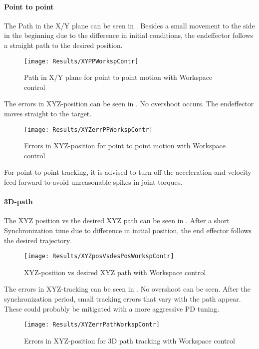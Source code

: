 \paragraph{Point to point}
The Path in the X/Y plane can be seen in . 
Besides a small movement to the side in the beginning due to the difference in initial conditions, the endeffector follows a straight path to the desired position.
\begin{figure}[H]
	\texttt{[image: Results/XYPPWorkspContr]}
	\caption{Path in X/Y plane for point to point motion with Workspace control}
	\label{fig:XYPPWorkspContr}
\end{figure}
The errors in XYZ-position can be seen in .
No overshoot occurs. The endeffector moves straight to the target.
\begin{figure}[H]
	\texttt{[image: Results/XYZerrPPWorkspContr]}
	\caption{Errors in XYZ-position for point to point motion with Workspace control}
	\label{fig:XYZerrPPWorkspContr}
\end{figure}

For point to point tracking, it is advised to turn off the acceleration and velocity feed-forward to avoid unreasonable spikes in joint torques.

\paragraph{3D-path}
The XYZ position vs the desired XYZ path can be seen in . After a short Synchronization time due to difference in initial position, the end effector follows the desired trajectory.
\begin{figure}[H]
	\texttt{[image: Results/XYZposVsdesPosWorkspContr]}
	\caption{XYZ-position vs desired XYZ path with Workspace control}
	\label{fig:XYZposVsdesPosWorkspContr}
\end{figure}
The errors in XYZ-tracking can be seen in . No overshoot can be seen. After the synchronization period, small tracking errors that vary with the path appear. These could probably be mitigated with a more aggressive PD tuning.
\begin{figure}[H]
	\texttt{[image: Results/XYZerrPathWorkspContr]}
	\caption{Errors in XYZ-position for 3D path tracking with Workspace control}
	\label{fig:XYZerrPathWorkspContr}
\end{figure}


